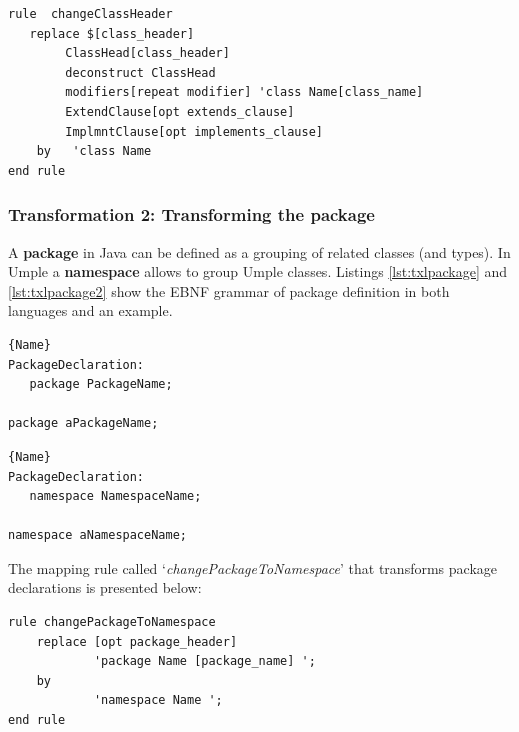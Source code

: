 \begin{lstlisting}[style=umplePlain, caption=TXL Mapping rule for transforming the class headers, label=lst:classHeader]
rule  changeClassHeader 	
   replace $[class_header] 		
    	ClassHead[class_header] 		
    	deconstruct ClassHead 					
    	modifiers[repeat modifier] 'class Name[class_name] 
        ExtendClause[opt extends_clause] 
        ImplmntClause[opt implements_clause]          
    by 	 'class Name 
end rule

\end{lstlisting}

\subsubsection{Transformation 2: Transforming the package} 

A \textbf{package} in Java can be defined as a grouping of related classes (and types). In Umple a \textbf{namespace} allows to group Umple classes. Listings \ref{lst:txlpackage} and \ref{lst:txlpackage2} show the EBNF grammar of package definition in both languages and an example. 

\noindent\begin{minipage}{.45\textwidth}
\begin{lstlisting}[style=umplePlain,caption=Java Package,label=lst:txlpackage]{Name}
PackageDeclaration:
   package PackageName; 

package aPackageName;
\end{lstlisting}
\end{minipage}\hfill
\begin{minipage}{.45\textwidth}
\begin{lstlisting}[style=umplePlain,caption=Umple Namespace,label=lst:txlpackage2]{Name}
PackageDeclaration:
   namespace NamespaceName;
 
namespace aNamespaceName;
\end{lstlisting}
\end{minipage}


The mapping rule called `\textit{changePackageToNamespace}' that transforms package declarations is presented below:

\begin{lstlisting}[style=umplePlain, label=lst:packageDeclRule3, caption=TXL mapping rule for the transformation of the package declaration]
rule changePackageToNamespace 
    replace [opt package_header]      
            'package Name [package_name] '; 
    by       
            'namespace Name '; 
end rule	
\end{lstlisting}

